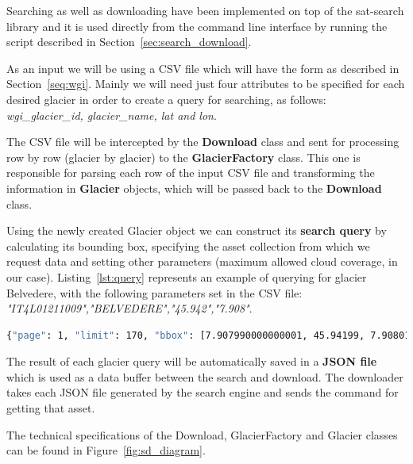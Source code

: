 \documentclass[12pt, a4paper]{report}
\begin{document}
	\par Searching as well as downloading have been implemented on top of the sat-search library and it is used directly from the command line interface by running the script described in Section~\ref{sec:search_download}.
	
	\par As an input we will be using a CSV file which will have the form as described in Section~\ref{seq:wgi}. Mainly we will need just four attributes to be specified for each desired glacier in order to create a query for searching, as follows: \textit{wgi\_glacier\_id, glacier\_name, lat and lon}.
	
	\par The CSV file will be intercepted by the \textbf{Download } class and sent for processing row by row (glacier by glacier) to the \textbf{GlacierFactory} class. This one is responsible for parsing each row of the input CSV file and transforming the information in \textbf{Glacier} objects, which will be passed back to the \textbf{Download} class.
	
	\par Using the newly created Glacier object we can construct its \textbf{search query} by calculating its bounding box, specifying the asset collection from which we request data and setting other parameters (maximum allowed cloud coverage, in our case). Listing~\ref{lst:query} represents an example of querying for glacier Belvedere, with the following parameters set in the CSV file: \textit{"IT4L01211009","BELVEDERE","45.942","7.908"}.
	
	\begin{lstlisting}[caption={Search query created by sat-search},label={lst:query},language=Bash]
		{"page": 1, "limit": 170, "bbox": [7.907990000000001, 45.94199, 7.90801, 45.94201], "query": {"eo:cloud_cover": {"lt": 10}}, "collection": "landsat-8-l1"}
	\end{lstlisting}

	\par The result of each glacier query will be automatically saved in a \textbf{JSON file} which is used as a data buffer between the search and download. The downloader takes each JSON file generated by the search engine and sends the command for getting that asset.
	
	\par The technical specifications of the Download, GlacierFactory and Glacier classes can be found in Figure~\ref{fig:sd_diagram}.
	
\end{document}
